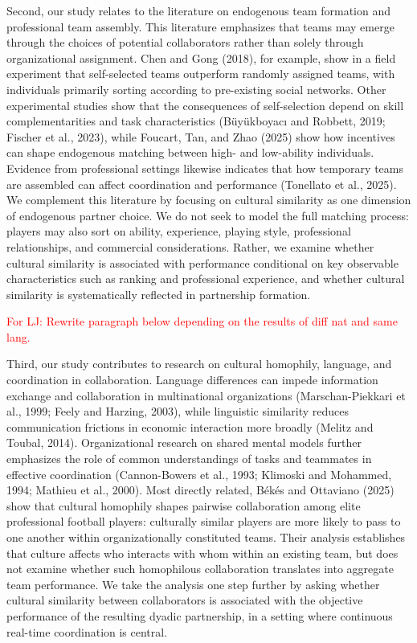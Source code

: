 \documentclass[10pt]{article}
\begin{document}
Second, our study relates to the literature on endogenous team formation and professional team assembly. This literature emphasizes that teams may emerge through the choices of potential collaborators rather than solely through organizational assignment. Chen and Gong (2018), for example, show in a field experiment that self-selected teams outperform randomly assigned teams, with individuals primarily sorting according to pre-existing social networks. Other experimental studies show that the consequences of self-selection depend on skill complementarities and task characteristics (Büyükboyacı and Robbett, 2019; Fischer et al., 2023), while Foucart, Tan, and Zhao (2025) show how incentives can shape endogenous matching between high- and low-ability individuals. Evidence from professional settings likewise indicates that how temporary teams are assembled can affect coordination and performance (Tonellato et al., 2025). We complement this literature by focusing on cultural similarity as one dimension of endogenous partner choice. We do not seek to model the full matching process: players may also sort on ability, experience, playing style, professional relationships, and commercial considerations. Rather, we examine whether cultural similarity is associated with performance conditional on key observable characteristics such as ranking and professional experience, and whether cultural similarity is systematically reflected in partnership formation.

\textcolor{red}{For LJ: Rewrite paragraph below depending on the results of diff nat and same lang.}

Third, our study contributes to research on cultural homophily, language, and coordination in collaboration. Language differences can impede information exchange and collaboration in multinational organizations (Marschan-Piekkari et al., 1999; Feely and Harzing, 2003), while linguistic similarity reduces communication frictions in economic interaction more broadly (Melitz and Toubal, 2014). Organizational research on shared mental models further emphasizes the role of common understandings of tasks and teammates in effective coordination (Cannon-Bowers et al., 1993; Klimoski and Mohammed, 1994; Mathieu et al., 2000). Most directly related, Békés and Ottaviano (2025) show that cultural homophily shapes pairwise collaboration among elite professional football players: culturally similar players are more likely to pass to one another within organizationally constituted teams. Their analysis establishes that culture affects who interacts with whom within an existing team, but does not examine whether such homophilous collaboration translates into aggregate team performance. We take the analysis one step further by asking whether cultural similarity between collaborators is associated with the objective performance of the resulting dyadic partnership, in a setting where continuous real-time coordination is central.
\end{document}

